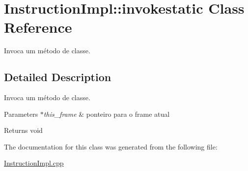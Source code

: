 \hypertarget{class_instruction_impl_1_1invokestatic}{}\section{Instruction\+Impl\+:\+:invokestatic Class Reference}
\label{class_instruction_impl_1_1invokestatic}


Invoca um método de classe.  




\subsection{Detailed Description}
Invoca um método de classe. 


\begin{DoxyParams}{Parameters}
{\em $\ast$this\+\_\+frame} & ponteiro para o frame atual \\
\hline
\end{DoxyParams}
\begin{DoxyReturn}{Returns}
void 
\end{DoxyReturn}


The documentation for this class was generated from the following file\+:\begin{DoxyCompactItemize}
\item 
\hyperlink{_instruction_impl_8cpp}{Instruction\+Impl.\+cpp}\end{DoxyCompactItemize}
